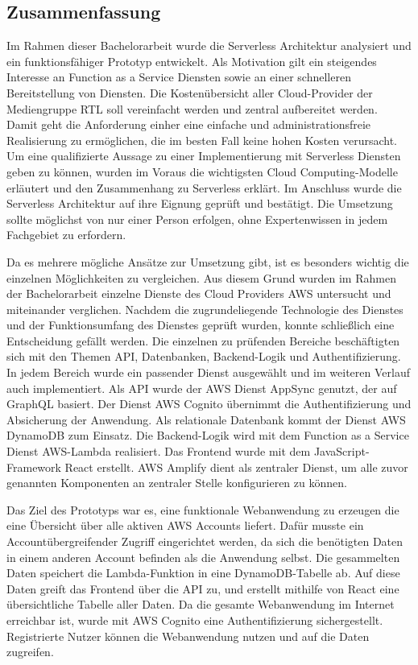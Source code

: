 \subsection{Zusammenfassung}
Im Rahmen dieser Bachelorarbeit wurde die Serverless Architektur analysiert und ein funktionsfähiger Prototyp entwickelt.
Als Motivation gilt ein steigendes Interesse an Function as a Service Diensten sowie an einer schnelleren Bereitstellung von Diensten.
Die Kostenübersicht aller Cloud-Provider der Mediengruppe RTL soll vereinfacht werden und zentral aufbereitet werden.
Damit geht die Anforderung einher eine einfache und administrationsfreie Realisierung zu ermöglichen, die im besten Fall keine hohen Kosten verursacht.
Um eine qualifizierte Aussage zu einer Implementierung mit Serverless Diensten geben zu können, wurden im Voraus die wichtigsten Cloud Computing-Modelle erläutert und den Zusammenhang zu Serverless erklärt.
Im Anschluss wurde die Serverless Architektur auf ihre Eignung geprüft und bestätigt.
Die Umsetzung sollte möglichst von nur einer Person erfolgen, ohne Expertenwissen in jedem Fachgebiet zu erfordern.

Da es mehrere mögliche Ansätze zur Umsetzung gibt, ist es besonders wichtig die einzelnen Möglichkeiten zu vergleichen.
Aus diesem Grund wurden im Rahmen der Bachelorarbeit einzelne Dienste des Cloud Providers AWS untersucht und miteinander verglichen.
Nachdem die zugrundeliegende Technologie des Dienstes und der Funktionsumfang des Dienstes geprüft wurden, konnte schließlich eine Entscheidung gefällt werden.
Die einzelnen zu prüfenden Bereiche beschäftigten sich mit den Themen API, Datenbanken, Backend-Logik und Authentifizierung.
In jedem Bereich wurde ein passender Dienst ausgewählt und im weiteren Verlauf auch implementiert.
Als API wurde der AWS Dienst AppSync genutzt, der auf GraphQL basiert.
Der Dienst AWS Cognito übernimmt die Authentifizierung und Absicherung der Anwendung.
Als relationale Datenbank kommt der Dienst AWS DynamoDB zum Einsatz.
Die Backend-Logik wird mit dem Function as a Service Dienst AWS-Lambda realisiert.
Das Frontend wurde mit dem JavaScript-Framework React erstellt.
AWS Amplify dient als zentraler Dienst, um alle zuvor genannten Komponenten an zentraler Stelle konfigurieren zu können.

Das Ziel des Prototyps war es, eine funktionale Webanwendung zu erzeugen die eine Übersicht über alle aktiven AWS Accounts liefert.
Dafür musste ein Accountübergreifender Zugriff eingerichtet werden, da sich die benötigten Daten in einem anderen Account befinden als die Anwendung selbst.
Die gesammelten Daten speichert die Lambda-Funktion in eine DynamoDB-Tabelle ab.
Auf diese Daten greift das Frontend über die API zu, und erstellt mithilfe von React eine übersichtliche Tabelle aller Daten.
Da die gesamte Webanwendung im Internet erreichbar ist, wurde mit AWS Cognito eine Authentifizierung sichergestellt.
Registrierte Nutzer können die Webanwendung nutzen und auf die Daten zugreifen.

